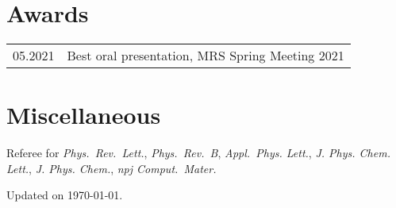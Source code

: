 \documentclass[a4paper, 11pt, DIV=15,headings=normal]{scrartcl}
\begin{document}
\section*{Awards}
\begin{tabular}{ll}
05.2021        & Best oral presentation, MRS Spring Meeting 2021
\end{tabular}

\section*{Miscellaneous}
Referee for \textit{Phys.\ Rev.\ Lett.}, \textit{Phys.\ Rev.\ B}, \textit{Appl.\ Phys. Lett.},
\textit{J. Phys. Chem. Lett.}, \textit{J. Phys. Chem.}, \textit{npj Comput.\ Mater.}


\newrefsegment
\AtNextBibliography{\small}
\nocite{*}
\printbibliography[title={Publications in Chronological Order}]

\bigskip

\begin{minipage}{0.4\linewidth}
\scriptsize Updated on \today.
\end{minipage}
\end{document}
